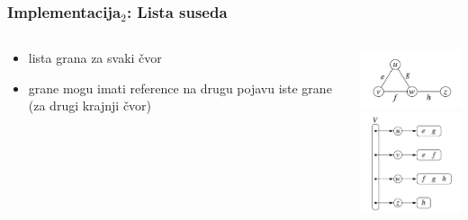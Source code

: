 \documentclass[compress,aspectratio=169]{beamer}
\begin{document}
\begin{frame}[fragile]
  \frametitle{Implementacija$_2$: Lista suseda}
  \begin{columns}
    \begin{column}[t]{6cm}
      \begin{itemize}
        \item lista grana za svaki čvor
        \item grane mogu imati reference na drugu pojavu iste grane (za 
          drugi krajnji čvor)
      \end{itemize}
    \end{column}
    \begin{column}[t]{6cm}
      \begin{center}
        \includegraphics[width=4cm]{asp-14-pic10.png} \\
        \includegraphics[width=4cm]{asp-14-pic11.png}
      \end{center}
    \end{column}
  \end{columns}
\end{frame}
\end{document}
